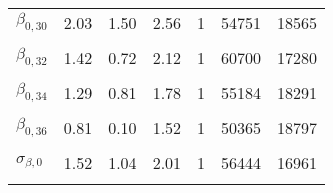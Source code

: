 \begin{table}
\begin{tabular}[t]{lrrrrrr}
$\beta_{0, 30}$ & 2.03 & 1.50 & 2.56 & 1 & 54751 & 18565\\
\cellcolor{gray!6}{$\beta_{0, 31}$} & \cellcolor{gray!6}{1.77} & \cellcolor{gray!6}{1.06} & \cellcolor{gray!6}{2.47} & \cellcolor{gray!6}{1} & \cellcolor{gray!6}{56358} & \cellcolor{gray!6}{17200}\\
$\beta_{0, 32}$ & 1.42 & 0.72 & 2.12 & 1 & 60700 & 17280\\
\cellcolor{gray!6}{$\beta_{0, 33}$} & \cellcolor{gray!6}{1.07} & \cellcolor{gray!6}{0.47} & \cellcolor{gray!6}{1.68} & \cellcolor{gray!6}{1} & \cellcolor{gray!6}{55672} & \cellcolor{gray!6}{18807}\\
$\beta_{0, 34}$ & 1.29 & 0.81 & 1.78 & 1 & 55184 & 18291\\
\cellcolor{gray!6}{$\beta_{0, 35}$} & \cellcolor{gray!6}{0.70} & \cellcolor{gray!6}{0.17} & \cellcolor{gray!6}{1.25} & \cellcolor{gray!6}{1} & \cellcolor{gray!6}{53125} & \cellcolor{gray!6}{17742}\\
$\beta_{0, 36}$ & 0.81 & 0.10 & 1.52 & 1 & 50365 & 18797\\
\cellcolor{gray!6}{$\mu_{\beta, 0}$} & \cellcolor{gray!6}{2.39} & \cellcolor{gray!6}{1.89} & \cellcolor{gray!6}{2.89} & \cellcolor{gray!6}{1} & \cellcolor{gray!6}{53756} & \cellcolor{gray!6}{18788}\\
$\sigma_{\beta, 0}$ & 1.52 & 1.04 & 2.01 & 1 & 56444 & 16961\\
\cellcolor{gray!6}{$\sigma_{y}$} & \cellcolor{gray!6}{0.71} & \cellcolor{gray!6}{0.63} & \cellcolor{gray!6}{0.81} & \cellcolor{gray!6}{1} & \cellcolor{gray!6}{26952} & \cellcolor{gray!6}{20528}\\
\bottomrule
\end{tabular}
\end{table}